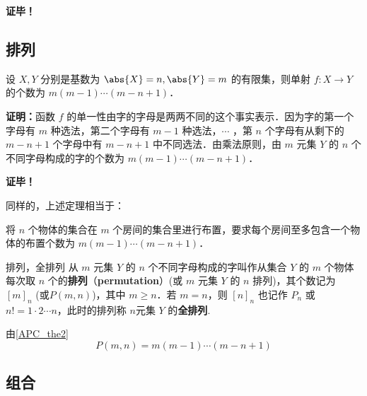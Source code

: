 \textbf{证毕！}
\subsection{排列}
\begin{theorem}{}
设 $X,Y$ 分别是基数为 $\abs{X}=n,\abs{Y}=m$ 的有限集，则单射 $f:X\rightarrow Y$ 的个数为 $m(m-1)\cdots(m-n+1)$．
\end{theorem}
\textbf{证明：}函数 $f$ 的单一性由字的字母是两两不同的这个事实表示．因为字的第一个字母有 $m$ 种选法，第二个字母有 $m-1$ 种选法，$\cdots$ ，第 $n$ 个字母有从剩下的 $m-n+1$ 个字母中有 $m-n+1$ 中不同选法．由乘法原则，由 $m$ 元集 $Y$ 的 $n$ 个不同字母构成的字的个数为 $m(m-1)\cdots(m-n+1)$．

\textbf{证毕！}

同样的，上述定理相当于：
\begin{theorem}{}\label{APC_the2}
将 $n$ 个物体的集合在 $m$ 个房间的集合里进行布置，要求每个房间至多包含一个物体的布置个数为 $m(m-1)\cdots(m-n+1)$．
\end{theorem}

\begin{definition}{排列，全排列}
从 $m$ 元集 $Y$ 的 $n$ 个不同字母构成的字叫作从集合 $Y$ 的 $m$ 个物体每次取 $n$ 个的\textbf{排列}（\textbf{permutation}）(或 $m$ 元集 $Y$ 的 $n$ 排列)，其个数记为 $[m]_n$ (或$P(m,n)$)，其中 $m\geq n$．若 $m=n$，则 $[n]_n$ 也记作 $P_n$ 或 $n!=1\cdot2\cdots n$，此时的排列称 $n$元集 $Y$ 的\textbf{全排列}.
\end{definition}
由\autoref{APC_the2} 
\begin{equation}
P(m,n)=m(m-1)\cdots(m-n+1)
\end{equation}

\subsection{组合}

